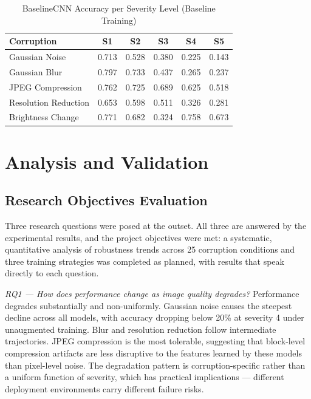 \documentclass[conference]{IEEEtran}
\begin{document}
\begin{table}[h]
\caption{BaselineCNN Accuracy per Severity Level (Baseline Training)}
\label{tab:severity}
\centering
\begin{tabular}{lccccc}
\toprule
\textbf{Corruption} & \textbf{S1} & \textbf{S2} & \textbf{S3} & \textbf{S4} & \textbf{S5} \\
\midrule
Gaussian Noise       & 0.713 & 0.528 & 0.380 & 0.225 & 0.143 \\
Gaussian Blur        & 0.797 & 0.733 & 0.437 & 0.265 & 0.237 \\
JPEG Compression     & 0.762 & 0.725 & 0.689 & 0.625 & 0.518 \\
Resolution Reduction & 0.653 & 0.598 & 0.511 & 0.326 & 0.281 \\
Brightness Change    & 0.771 & 0.682 & 0.324 & 0.758 & 0.673 \\
\bottomrule
\end{tabular}
\end{table}

\section{Analysis and Validation}

\subsection{Research Objectives Evaluation}

Three research questions were posed at the outset. All three are answered by the experimental results, and the project objectives were met: a systematic, quantitative analysis of robustness trends across 25 corruption conditions and three training strategies was completed as planned, with results that speak directly to each question.

\textit{RQ1 --- How does performance change as image quality degrades?} Performance degrades substantially and non-uniformly. Gaussian noise causes the steepest decline across all models, with accuracy dropping below 20\% at severity 4 under unaugmented training. Blur and resolution reduction follow intermediate trajectories. JPEG compression is the most tolerable, suggesting that block-level compression artifacts are less disruptive to the features learned by these models than pixel-level noise. The degradation pattern is corruption-specific rather than a uniform function of severity, which has practical implications --- different deployment environments carry different failure risks.
\end{document}
